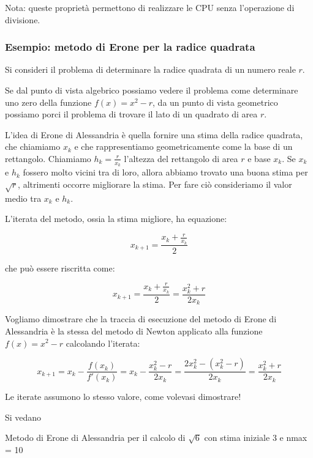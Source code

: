 Nota: queste proprietà permettono di realizzare le CPU senza l'operazione di divisione.


\subsubsection{Esempio: metodo di Erone per la radice quadrata}

Si consideri il problema di determinare la radice quadrata di un numero reale $r$.

Se dal punto di vista algebrico possiamo vedere il problema come determinare uno zero della funzione $f(x) = x^2 - r$,
da un punto di vista geometrico possiamo porci il problema di trovare il lato di un quadrato di area $r$.


L'idea di Erone di Alessandria è quella fornire una stima della radice quadrata, che chiamiamo $x_k$ e che
rappresentiamo geometricamente come la base di un rettangolo. Chiamiamo $h_k = \frac{r}{x_k}$ l'altezza del rettangolo
di area $r$ e base $x_k$.
Se $x_k$ e $h_k$ fossero molto vicini tra di loro, allora abbiamo trovato una buona stima per $\sqrt{r}$, altrimenti
occorre migliorare la stima. Per fare ciò consideriamo il valor medio tra $x_k$ e $h_k$.

L'iterata del metodo, ossia la stima migliore, ha equazione:

$$x_{k+1} = \frac{x_k+\frac{r}{x_k}}{2}$$

che può essere riscritta come:

$$x_{k+1} = \frac{x_k+ \frac{r}{x_k}}{2} = \frac{x_k^2 + r}{2x_k}$$

Vogliamo dimostrare che la traccia di esecuzione del metodo di Erone di Alessandria è la stessa del metodo
di Newton applicato alla funzione $f(x) = x^2 - r$ calcolando l'iterata:

$$x_{k+1} = x_k - \frac{f(x_k)}{f'(x_k)} =
            x_k - \frac{x_k^2 - r}{2 x_k} =
            \frac{2 x_k^2 - ( x_k^2 - r)}{2 x_k} =
            \frac{x_k^2 + r}{2 x_k}$$

Le iterate assumono lo stesso valore, come volevasi dimostrare!

Si vedano 

\begin{table}[!htbp]
    \begin{center}
\end{center}        
\caption[]{Metodo di Erone di Alessandria per il calcolo di $\sqrt{6}$ con stima iniziale 3 e nmax = 10}
\label{tab:erone_sqrt_6}
\end{table}

